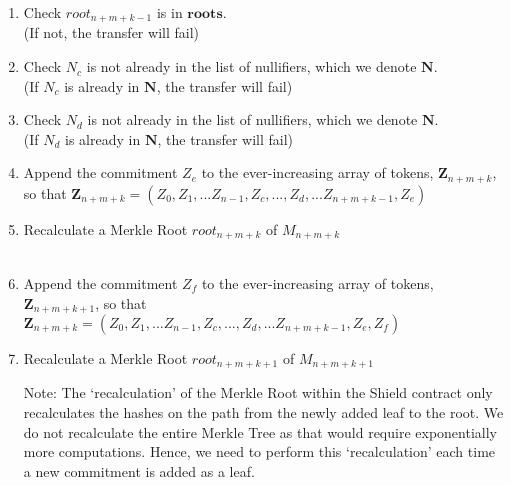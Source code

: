 \documentclass{article}
\begin{document}
\begin{enumerate}
  \item Check $root_{n+m+k-1}$ is in $\bm{roots}$.\\
    (If not, the transfer will fail)
  \item Check $N_c$ is not already in the list of nullifiers, which we denote $\bm{N}$.\\
    (If $N_c$ is already in $\bm{N}$, the transfer will fail)
  \item Check $N_d$ is not already in the list of nullifiers, which we denote $\bm{N}$.\\
  (If $N_d$ is already in $\bm{N}$, the transfer will fail)
  \item Append the commitment $Z_e$ to the ever-increasing array of tokens, $\bm{Z}_{n+m+k}$, so that $\bm{Z}_{n+m+k}=(Z_0, Z_1, ... Z_{n-1}, Z_c, ..., Z_d,... Z_{n+m+k-1}, Z_e)$\\
  \item Recalculate a Merkle Root $root_{n+m+k}$ of $M_{n+m+k}$\\
    \\
  \item Append the commitment $Z_f$ to the ever-increasing array of tokens, $\bm{Z}_{n+m+k+1}$, so that $\bm{Z}_{n+m+k}=(Z_0, Z_1, ... Z_{n-1}, Z_c, ..., Z_d,... Z_{n+m+k-1}, Z_e, Z_f)$\\
  \item Recalculate a Merkle Root $root_{n+m+k+1}$ of $M_{n+m+k+1}$

    Note: The `recalculation' of the Merkle Root within the Shield contract only recalculates the hashes on the path from the newly added leaf to the root. We do not recalculate the entire Merkle Tree as that would require exponentially more computations. Hence, we need to perform this `recalculation' each time a new commitment is added as a leaf.


\end{enumerate}
\end{document}
